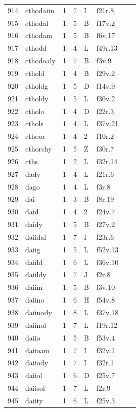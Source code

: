 \documentclass[11pt,a4paper]{article}
\begin{document}
\begin{landscape}
\begin{longtable}{@{}r>{\ttfamily}lrrl>{\ttfamily}l>{\raggedright\arraybackslash}p{80mm}>{\raggedright\arraybackslash}p{36mm}@{}}
914 & cthodaiin & 1 & 7 & I & f21r.8 &  & \\
915 & cthodal & 1 & 5 & B & f17v.2 &  & \\
916 & cthodam & 1 & 5 & B & f6v.17 &  & \\
917 & cthodd & 1 & 4 & L & f49r.13 &  & \\
918 & cthodoaly & 1 & 7 & B & f3v.9 &  & \\
919 & cthold & 1 & 4 & B & f29v.2 &  & \\
920 & ctholdg & 1 & 5 & D & f14v.9 &  & \\
921 & ctholdy & 1 & 5 & L & f30v.2 &  & \\
922 & ctholo & 1 & 4 & D & f22r.3 &  & \\
923 & cthols & 1 & 4 & L & f37v.21 &  & \\
924 & cthoor & 1 & 4 & 2 & f10r.2 &  & \\
925 & cthorchy & 1 & 5 & Z & f30r.7 &  & \\
926 & cths & 1 & 2 & L & f32r.14 &  & \\
927 & dady & 1 & 4 & L & f21r.6 &  & \\
928 & dago & 1 & 4 & L & f3r.8 &  & \\
929 & dai & 1 & 3 & B & f8r.19 &  & \\
930 & daid & 1 & 4 & 2 & f24v.7 &  & \\
931 & daidy & 1 & 5 & B & f27v.2 &  & \\
932 & daiidal & 1 & 7 & I & f23r.6 &  & \\
933 & daiig & 1 & 5 & L & f52v.13 &  & \\
934 & daiild & 1 & 6 & L & f36v.10 &  & \\
935 & daiildy & 1 & 7 & J & f2r.8 &  & \\
936 & daiim & 1 & 5 & B & f3v.10 &  & \\
937 & daiino & 1 & 6 & H & f54v.8 &  & \\
938 & daiinody & 1 & 8 & L & f37v.18 &  & \\
939 & daiinol & 1 & 7 & L & f19r.12 &  & \\
940 & daiio & 1 & 5 & B & f53v.4 &  & \\
941 & daiioam & 1 & 7 & I & f32v.1 &  & \\
942 & daiiody & 1 & 7 & I & f32r.1 &  & \\
943 & daiiol & 1 & 6 & D & f25v.7 &  & \\
944 & daiisol & 1 & 7 & L & f2r.9 &  & \\
945 & daiity & 1 & 6 & L & f25v.3 &  & \\

\end{longtable}
\end{landscape}
\end{document}

